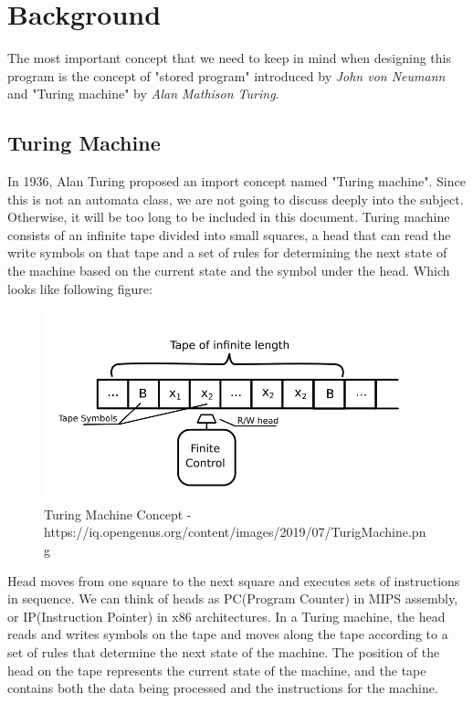 \documentclass{homework}
\begin{document}
\section{Background}
The most important concept that we need to keep in mind when designing this program is the concept of "stored program" introduced by \textit{John von Neumann} and "Turing machine" by \textit{Alan Mathison Turing}.  

\subsection{Turing Machine}
In 1936, Alan Turing proposed an import concept named "Turing machine". Since this is not an automata class, we are not going to discuss deeply into the subject. Otherwise, it will be too long to be included in this document. Turing machine consists of an infinite tape divided into small squares, a head that can read the write symbols on that tape and a set of rules for determining the next state of the machine based on the current state and the symbol under the head. Which looks like following figure: 

\begin{figure}[h]
\begin{center}
\includegraphics[scale=0.5]{TurigMachine.png}    
\caption{Turing Machine Concept - https://iq.opengenus.org/content/images/2019/07/TurigMachine.png}
\end{center}
\end{figure}

Head moves from one square to the next square and executes sets of instructions in sequence. We can think of heads as PC(Program Counter) in MIPS assembly, or IP(Instruction Pointer) in x86 architectures. In a Turing machine, the head reads and writes symbols on the tape and moves along the tape according to a set of rules that determine the next state of the machine. The position of the head on the tape represents the current state of the machine, and the tape contains both the data being processed and the instructions for the machine. 
\end{document}
